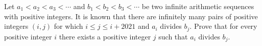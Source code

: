Let $a_1<a_2<a_3<\cdots$ and $b_1<b_2<b_3<\cdots$ be two infinite arithmetic sequences with positive integers.
It is known that there are infinitely many pairs of positive integers $(i,j)$ for which $i\leq j\leq i+2021$ and $a_i$ divides $b_j$.
Prove that for every positive integer $i$ there exists a positive integer $j$ such that $a_i$ divides $b_j$.
